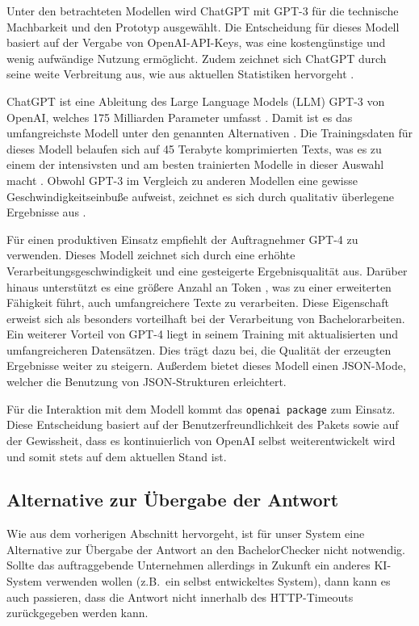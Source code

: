 Unter den betrachteten Modellen wird ChatGPT mit GPT-3 für die technische Machbarkeit und den Prototyp ausgewählt.
Die Entscheidung für dieses Modell basiert auf der Vergabe von OpenAI-API-Keys, was eine kostengünstige und wenig aufwändige Nutzung ermöglicht.
Zudem zeichnet sich ChatGPT durch seine weite Verbreitung aus, wie aus aktuellen Statistiken hervorgeht \autocite{statista.gpt}.

ChatGPT ist eine Ableitung des Large Language Models (LLM) GPT-3 von OpenAI, welches 175 Milliarden Parameter umfasst \autocite[][S. 5]{openai.gpt}.
Damit ist es das umfangreichste Modell unter den genannten Alternativen \autocite{statista.gpt}.
Die Trainingsdaten für dieses Modell belaufen sich auf 45 Terabyte komprimierten Texts, was es zu einem der intensivsten und am besten trainierten Modelle in dieser Auswahl macht \autocite[][S. 8]{openai.gpt}.
Obwohl GPT-3 im Vergleich zu anderen Modellen eine gewisse Geschwindigkeitseinbuße aufweist, zeichnet es sich durch qualitativ überlegene Ergebnisse aus \autocite{mindsdb.llm}.

Für einen produktiven Einsatz empfiehlt der Auftragnehmer GPT-4 zu verwenden.
Dieses Modell zeichnet sich durch eine erhöhte Verarbeitungsgeschwindigkeit und eine gesteigerte Ergebnisqualität aus.
Darüber hinaus unterstützt es eine größere Anzahl an Token \autocite{openai.gpt4}, was zu einer erweiterten Fähigkeit führt, auch umfangreichere Texte zu verarbeiten.
Diese Eigenschaft erweist sich als besonders vorteilhaft bei der Verarbeitung von Bachelorarbeiten.
Ein weiterer Vorteil von GPT-4 liegt in seinem Training mit aktualisierten und umfangreicheren Datensätzen.
Dies trägt dazu bei, die Qualität der erzeugten Ergebnisse weiter zu steigern.
Außerdem bietet dieses Modell einen \ac{JSON}-Mode, welcher die Benutzung von \ac{JSON}-Strukturen erleichtert.

Für die Interaktion mit dem Modell kommt das \texttt{openai package} zum Einsatz.
Diese Entscheidung basiert auf der Benutzerfreundlichkeit des Pakets sowie auf der Gewissheit,
dass es kontinuierlich von OpenAI selbst weiterentwickelt wird und somit stets auf dem aktuellen Stand ist.


\subsection{Alternative zur Übergabe der Antwort}\label{subsec:alternative-zur-uebergabe-der-antwort}
Wie aus dem vorherigen Abschnitt hervorgeht, ist für unser System eine Alternative zur Übergabe der Antwort
an den BachelorChecker nicht notwendig.
Sollte das auftraggebende Unternehmen allerdings in Zukunft ein anderes KI-System verwenden wollen (z.B.\ ein selbst entwickeltes System),
dann kann es auch passieren, dass die Antwort nicht innerhalb des HTTP-Timeouts zurückgegeben werden kann.

